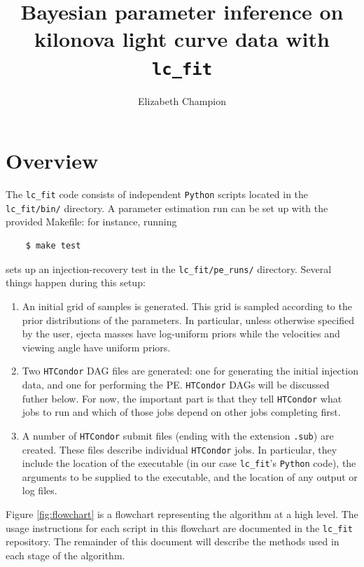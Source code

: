 \documentclass[11pt]{article}
\title{Bayesian parameter inference on kilonova light curve data with \texttt{lc\_fit}}
\author{Elizabeth Champion}
\begin{document}
\maketitle

\section{Overview}

The \texttt{lc\_fit} code consists of independent \texttt{Python} scripts located in the \texttt{lc\_fit/bin/} directory. A parameter estimation run can be set up with the provided Makefile: for instance, running
\begin{verbatim}
	$ make test	
\end{verbatim}
sets up an injection-recovery test in the \texttt{lc\_fit/pe\_runs/} directory. Several things happen during this setup:
\begin{enumerate}
	\item An initial grid of samples is generated. This grid is sampled according to the prior distributions of the parameters. In particular, unless otherwise specified by the user, ejecta masses have log-uniform priors while the velocities and viewing angle have uniform priors.
	\item Two \texttt{HTCondor} DAG files are generated: one for generating the initial injection data, and one for performing the PE. \texttt{HTCondor} DAGs will be discussed futher below. For now, the important part is that they tell \texttt{HTCondor} what jobs to run and which of those jobs depend on other jobs completing first.
	\item A number of \texttt{HTCondor} submit files (ending with the extension \texttt{.sub}) are created. These files describe individual \texttt{HTCondor} jobs. In particular, they include the location of the executable (in our case \texttt{lc\_fit}'s \texttt{Python} code), the arguments to be supplied to the executable, and the location of any output or log files.
\end{enumerate}

Figure \ref{fig:flowchart} is a flowchart representing the algorithm at a high level. The usage instructions for each script in this flowchart are documented in the \texttt{lc\_fit} repository. The remainder of this document will describe the methods used in each stage of the algorithm.
\end{document}
